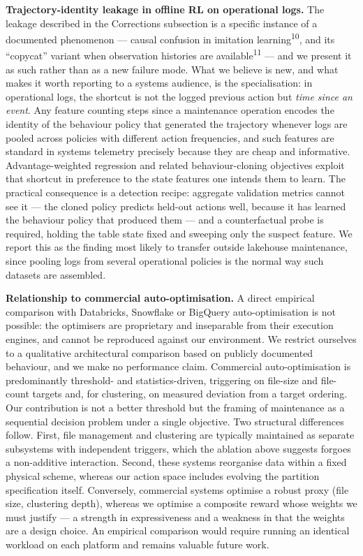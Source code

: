 \documentclass[fleqn,10pt]{wlscirep}
\begin{document}
\textbf{Trajectory-identity leakage in offline RL on operational logs.}
The leakage described in the Corrections subsection is a specific
instance of a documented phenomenon --- causal confusion in imitation
learning\textsuperscript{10}, and its ``copycat'' variant when
observation histories are
available\textsuperscript{11} --- and we present it as such rather
than as a new failure mode. What we believe is new, and what makes it
worth reporting to a systems audience, is the specialisation: in
operational logs, the shortcut is not the logged previous action but
\emph{time since an event}. Any feature counting steps since a
maintenance operation encodes the identity of the behaviour policy that
generated the trajectory whenever logs are pooled across policies with
different action frequencies, and such features are standard in systems
telemetry precisely because they are cheap and informative.
Advantage-weighted regression and related behaviour-cloning objectives
exploit that shortcut in preference to the state features one intends
them to learn. The practical consequence is a detection recipe:
aggregate validation metrics cannot see it --- the cloned policy
predicts held-out actions well, because it has learned the behaviour
policy that produced them --- and a counterfactual probe is required,
holding the table state fixed and sweeping only the suspect feature. We
report this as the finding most likely to transfer outside lakehouse
maintenance, since pooling logs from several operational policies is the
normal way such datasets are assembled.

\textbf{Relationship to commercial auto-optimisation.}
A direct empirical comparison with Databricks, Snowflake or BigQuery
auto-optimisation is not possible: the optimisers are proprietary and
inseparable from their execution engines, and cannot be reproduced
against our environment. We restrict ourselves to a qualitative
architectural comparison based on publicly documented behaviour, and we
make no performance claim. Commercial auto-optimisation is predominantly
threshold- and statistics-driven, triggering on file-size and file-count
targets and, for clustering, on measured deviation from a target
ordering. Our contribution is not a better threshold but the framing of
maintenance as a sequential decision problem under a single objective.
Two structural differences follow. First, file management and clustering
are typically maintained as separate subsystems with independent
triggers, which the ablation above suggests forgoes a non-additive
interaction. Second, these systems reorganise data within a fixed
physical scheme, whereas our action space includes evolving the
partition specification itself. Conversely, commercial systems optimise
a robust proxy (file size, clustering depth), whereas we optimise a
composite reward whose weights we must justify --- a strength in
expressiveness and a weakness in that the weights are a design choice.
An empirical comparison would require running an identical workload on
each platform and remains valuable future work.
\end{document}
